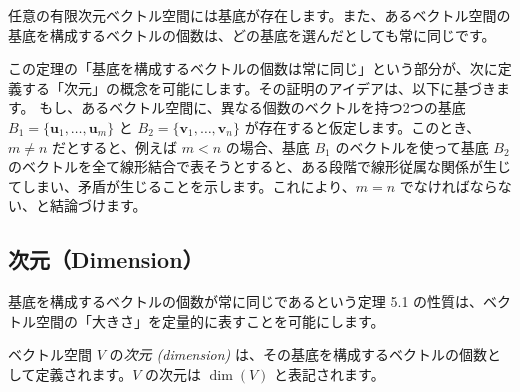 \begin{thm}[基底の存在と一意性]
任意の有限次元ベクトル空間には基底が存在します。また、あるベクトル空間の基底を構成するベクトルの個数は、どの基底を選んだとしても常に同じです。
\begin{proof*}
この定理の「基底を構成するベクトルの個数は常に同じ」という部分が、次に定義する「次元」の概念を可能にします。その証明のアイデアは、以下に基づきます。
もし、あるベクトル空間に、異なる個数のベクトルを持つ2つの基底 $B_1 = \{\bm{u}_1, \ldots, \bm{u}_m\}$ と $B_2 = \{\bm{v}_1, \ldots, \bm{v}_n\}$ が存在すると仮定します。このとき、$m \neq n$ だとすると、例えば $m < n$ の場合、基底 $B_1$ のベクトルを使って基底 $B_2$ のベクトルを全て線形結合で表そうとすると、ある段階で線形従属な関係が生じてしまい、矛盾が生じることを示します。これにより、$m=n$ でなければならない、と結論づけます。
\end{proof*}
\end{thm}

\subsection{次元（Dimension）}
基底を構成するベクトルの個数が常に同じであるという定理 5.1 の性質は、ベクトル空間の「大きさ」を定量的に表すことを可能にします。
\begin{dfn}[次元]
ベクトル空間 $V$ の\emph{次元 (dimension)} は、その基底を構成するベクトルの個数として定義されます。$V$ の次元は $\dim(V)$ と表記されます。
\end{dfn}

